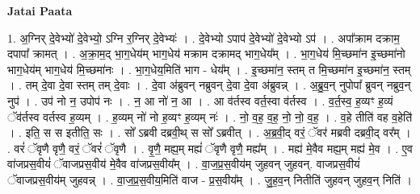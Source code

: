 \documentclass[17pt]{extarticle}
\begin{document}
\textbf{Jatai Paata} \newline

1. अ॒ग्निर् दे॒वेभ्यो॑ दे॒वेभ्यो॒ ऽग्नि र॒ग्निर् दे॒वेभ्यः॑ । . दे॒वेभ्यो ऽपाप॑ दे॒वेभ्यो॑ दे॒वेभ्यो ऽप॑ । . अपा᳚क्राम दक्राम॒ दपापा᳚ क्रामत् । . अ॒क्रा॒म॒द् भा॒ग॒धेय॑म् भाग॒धेय॑ मक्राम दक्रामद् भाग॒धेय᳚म् । . भा॒ग॒धेय॑ मि॒च्छमा॑न इ॒च्छमा॑नो भाग॒धेय॑म् भाग॒धेय॑ मि॒च्छमा॑नः । . भा॒ग॒धेय॒मिति॑ भाग - धेय᳚म् । . इ॒च्छमा॑न॒ स्तम् त मि॒च्छमा॑न इ॒च्छमा॑न॒ स्तम् । . तम् दे॒वा दे॒वा स्तम् तम् दे॒वाः । . दे॒वा अ॑ब्रुवन् नब्रुवन् दे॒वा दे॒वा अ॑ब्रुवन्न् । . अ॒ब्रु॒व॒न् नुपोपा᳚ ब्रुवन् नब्रुव॒न् नुप॑ । . उप॑ नो न॒ उपोप॑ नः । . न॒ आ नो॑ न॒ आ । . आ व॑र्तस्व वर्त॒स्वा व॑र्तस्व । . व॒र्त॒स्व॒ ह॒व्यꣳ ह॒व्यं ॅव॑र्तस्व वर्तस्व ह॒व्यम् । . ह॒व्यम् नो॑ नो ह॒व्यꣳ ह॒व्यम् नः॑ । . नो॒ व॒ह॒ व॒ह॒ नो॒ नो॒ व॒ह॒ । . व॒हे तीति॑ वह व॒हेति॑ । . इति॒ स स इतीति॒ सः । . सो᳚ ऽब्रवी दब्रवी॒थ् स सो᳚ ऽब्रवीत् । . अ॒ब्र॒वी॒द् वरं॒ ॅवर॑ मब्रवी दब्रवी॒द् वर᳚म् । . वरं॑ ॅवृणै वृणै॒ वरं॒ ॅवरं॑ ॅवृणै । . वृ॒णै॒ मह्य॒म् मह्यं॑ ॅवृणै वृणै॒ मह्य᳚म् । . मह्य॑ मे॒वैव मह्य॒म् मह्य॑ मे॒व । . ए॒व वा॑जप्रस॒वीयं॑ ॅवाजप्रस॒वीय॑ मे॒वैव वा॑जप्रस॒वीय᳚म् । . वा॒ज॒प्र॒स॒वीय॑म् जुहवन् जुहवन्. वाजप्रस॒वीयं॑ ॅवाजप्रस॒वीय॑म् जुहवन्न् । . वा॒ज॒प्र॒स॒वीय॒मिति॑ वाज - प्र॒स॒वीय᳚म् । . जु॒ह॒व॒न् नितीति॑ जुहवन् जुहव॒न् निति॑ । \newline
\end{document}
